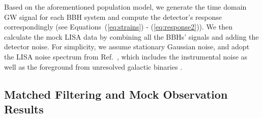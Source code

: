 \documentclass[%
 reprint,
 amsmath,amssymb,
 aps,
]{revtex4-2}
\begin{document}
Based on the aforementioned population model, we generate the time domain GW signal for each BBH system and compute the detector's response correspondingly (see Equations~(\ref{eq:strains}) - (\ref{eq:response2})). We then calculate the mock LISA data by combining all the BBHs' signals and adding the detector noise. For simplicity, we assume stationary Gaussian noise, and adopt the LISA noise spectrum from Ref.~\citep{Robson+19LISAnoise}, which includes the instrumental noise as well as the foreground from unresolved galactic binaries
\citep[see, e.g., ][]{Cornish2017galacticforeground}. 


\subsection{Matched Filtering and Mock Observation Results}\label{subsec:mockobsresult}
\end{document}
